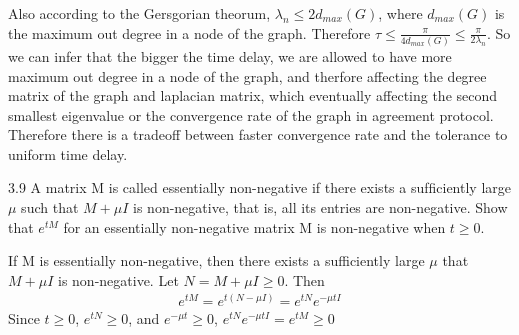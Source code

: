 \documentclass{article}
\begin{document}
\begin{problem}
    Also according to the Gersgorian theorum, $\lambda_n \leq 2 d_{max}(G)$, where $d_{max}(G)$ is the maximum out degree in a node of the graph. Therefore  $\tau \leq \frac{\pi}{4 d_{max}(G)}\leq \frac{\pi}{2\lambda_n}$. So we can infer that the bigger the time delay, we are allowed to have more maximum out degree in a node of the graph, and therfore affecting the degree matrix of the graph and laplacian matrix, which eventually affecting the second smallest eigenvalue  or the convergence rate of the graph in agreement protocol. Therefore there is a tradeoff between faster convergence rate and the tolerance to uniform time delay. 
\end{problem}
\begin{problem} 3.9
    A matrix M is called essentially non-negative if there exists a sufﬁciently large $\mu$ such that $M + \mu I$ is non-negative, that is, all its entries are non-negative. Show that $e^{tM}$ for an essentially non-negative matrix M is non-negative when $t \geq 0.$

    If M is essentially non-negative, then there exists a sufficiently large $\mu$ that $M + \mu I$ is non-negative. Let $N = M + \mu I \geq 0$. Then 
    \begin{align*}
        e^{tM} = e^{t(N - \mu I)} = e^{tN}e^{-\mu  tI}
    \end{align*}
    Since $t \geq 0$, $e^{tN} \geq 0$, and $e^{-\mu t} \geq 0$, $e^{tN}e^{-\mu t I} = e^{tM} \geq 0$
\end{problem}
\end{document}
